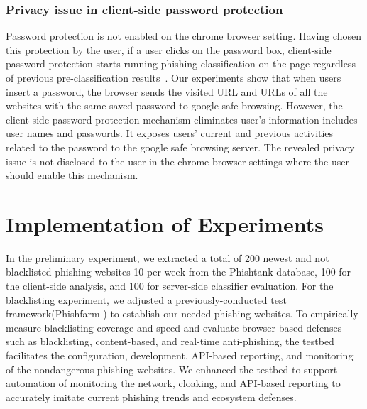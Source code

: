 \documentclass[letterpaper,twocolumn,10pt]{article}
\begin{document}
\subsubsection{Privacy issue in client-side password protection }
Password protection is not enabled on the chrome browser setting. Having chosen this protection by the user, if a user clicks on the password box, client-side password protection starts running phishing classification on the page regardless of previous pre-classification results~\cite{mardini_2019}. 
Our experiments show that when users insert a password, the browser sends the visited URL and URLs of all the websites with the same saved password to google safe browsing.   
However, the client-side password protection mechanism eliminates user's information includes user names and passwords. It exposes users' current and previous activities related to the password to the google safe browsing server. The revealed privacy issue is not disclosed to the user in the chrome browser settings where the user should enable this mechanism.

\section{Implementation of Experiments}
In the preliminary experiment, we extracted a total of 200 newest and not blacklisted phishing websites 10 per week from the Phishtank database, 100 for the client-side analysis, and 100 for server-side classifier evaluation. 
For the blacklisting experiment, we adjusted a previously-conducted test framework(Phishfarm \cite{oest2019phishfarm}) to establish our needed phishing websites.
To empirically measure blacklisting coverage and speed
and evaluate browser-based defenses such as blacklisting, content-based, and real-time anti-phishing, the testbed facilitates the configuration, development, API-based reporting, and monitoring of the nondangerous phishing websites.  We enhanced the testbed to support automation of monitoring the network, cloaking, and API-based reporting to accurately imitate current phishing trends and ecosystem defenses.
\end{document}
